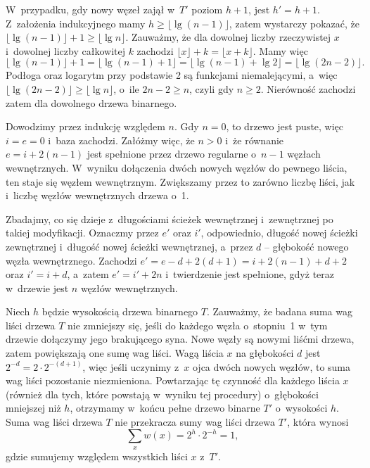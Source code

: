 W~przypadku, gdy nowy węzeł zajął w~$T'$ poziom $h+1$, jest $h'=h+1$.
Z~założenia indukcyjnego mamy $h\ge\lfloor\lg(n-1)\rfloor$, zatem wystarczy pokazać, że $\lfloor\lg(n-1)\rfloor+1\ge\lfloor\lg n\rfloor$.
Zauważmy, że dla dowolnej liczby rzeczywistej $x$ i~dowolnej liczby całkowitej $k$ zachodzi $\lfloor x\rfloor+k=\lfloor x+k\rfloor$.
Mamy więc
\[
    \lfloor\lg(n-1)\rfloor+1 = \lfloor\lg(n-1)+1\rfloor = \lfloor\lg(n-1)+\lg2\rfloor = \lfloor\lg(2n-2)\rfloor.
\]
Podłoga oraz logarytm przy podstawie 2 są funkcjami niemalejącymi, a~więc $\lfloor\lg(2n-2)\rfloor\ge\lfloor\lg n\rfloor$, o~ile $2n-2\ge n$, czyli gdy $n\ge2$.
Nierówność zachodzi zatem dla dowolnego drzewa binarnego.

\exercise %
Dowodzimy przez indukcję względem $n$.
Gdy $n=0$, to drzewo jest puste, więc $i=e=0$ i~baza zachodzi.
Załóżmy więc, że $n>0$ i~że równanie $e=i+2(n-1)$ jest spełnione przez drzewo regularne o~$n-1$ węzłach wewnętrznych.
W~wyniku dołączenia dwóch nowych węzłów do pewnego liścia, ten staje się węzłem wewnętrznym.
Zwiększamy przez to zarówno liczbę liści, jak i~liczbę węzłów wewnętrznych drzewa o~1.

Zbadajmy, co się dzieje z~długościami ścieżek wewnętrznej i~zewnętrznej po takiej modyfikacji.
Oznaczmy przez $e'$ oraz $i'$, odpowiednio, długość nowej ścieżki zewnętrznej i~długość nowej ścieżki wewnętrznej, a~przez $d$ -- głębokość nowego węzła wewnętrznego.
Zachodzi $e'=e-d+2(d+1)=i+2(n-1)+d+2$ oraz $i'=i+d$, a~zatem $e'=i'+2n$ i~twierdzenie jest spełnione, gdyż teraz w~drzewie jest $n$ węzłów wewnętrznych.

\exercise %
Niech $h$ będzie wysokością drzewa binarnego $T$.
Zauważmy, że badana suma wag liści drzewa $T$ nie zmniejszy się, jeśli do każdego węzła o~stopniu~1 w~tym drzewie dołączymy jego brakującego syna.
Nowe węzły są nowymi liśćmi drzewa, zatem powiększają one sumę wag liści.
Wagą liścia $x$ na głębokości $d$ jest $2^{-d}=2\cdot2^{-(d+1)}$, więc jeśli uczynimy z~$x$ ojca dwóch nowych węzłów, to suma wag liści pozostanie niezmieniona.
Powtarzając tę czynność dla każdego liścia $x$ (również dla tych, które powstają w~wyniku tej procedury) o~głębokości mniejszej niż $h$, otrzymamy w~końcu pełne drzewo binarne $T'$ o~wysokości $h$.
Suma wag liści drzewa $T$ nie przekracza sumy wag liści drzewa $T'$, która wynosi
\[
	\sum_{x}w(x) = 2^h\cdot2^{-h} = 1,
\]
gdzie sumujemy względem wszystkich liści $x$ z~$T'$.

\exercise %

